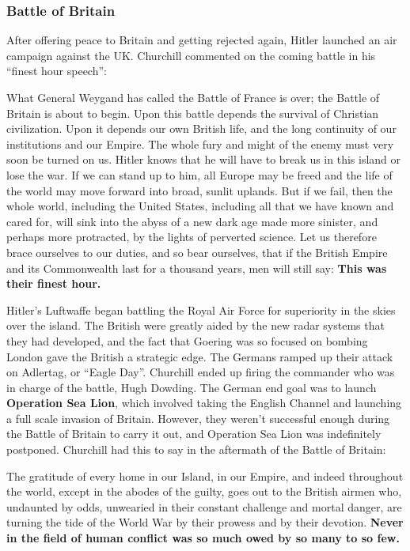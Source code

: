 \subsubsection*{Battle of Britain}

After offering peace to Britain and getting rejected again, Hitler launched an air campaign against the UK\@.
Churchill commented on the coming battle in his ``finest hour speech'':
\begin{quoting}
  What General Weygand has called the Battle of France is over;
  the Battle of Britain is about to begin.
  Upon this battle depends the survival of Christian civilization.
  Upon it depends our own British life, and the long continuity of our institutions and our Empire.
  The whole fury and might of the enemy must very soon be turned on us.
  Hitler knows that he will have to break us in this island or lose the war.
  If we can stand up to him,
  all Europe may be freed and the life of the world may move forward into broad, sunlit uplands.
  But if we fail, then the whole world, including the United States,
  including all that we have known and cared for, will sink into the abyss of a new dark age made more sinister,
  and perhaps more protracted, by the lights of perverted science.
  Let us therefore brace ourselves to our duties, and so bear ourselves,
  that if the British Empire and its Commonwealth last for a thousand years, men will still say:
  \textbf{This was their finest hour.}
\end{quoting}

Hitler's Luftwaffe began battling the Royal Air Force for superiority in the skies over the island.
The British were greatly aided by the new radar systems that they had developed,
and the fact that Goering was so focused on bombing London gave the British a strategic edge.
The Germans ramped up their attack on Adlertag, or ``Eagle Day''.
Churchill ended up firing the commander who was in charge of the battle, Hugh Dowding.
The German end goal was to launch \textbf{Operation Sea Lion},
which involved taking the English Channel and launching a full scale invasion of Britain.
However, they weren't successful enough during the Battle of Britain to carry it out,
and Operation Sea Lion was indefinitely postponed.
Churchill had this to say in the aftermath of the Battle of Britain:
\begin{quoting}
  The gratitude of every home in our Island, in our Empire, and indeed throughout the world,
  except in the abodes of the guilty, goes out to the British airmen who,
  undaunted by odds, unwearied in their constant challenge and mortal danger,
  are turning the tide of the World War by their prowess and by their devotion.
  \textbf{Never in the field of human conflict was so much owed by so many to so few.}
\end{quoting}


